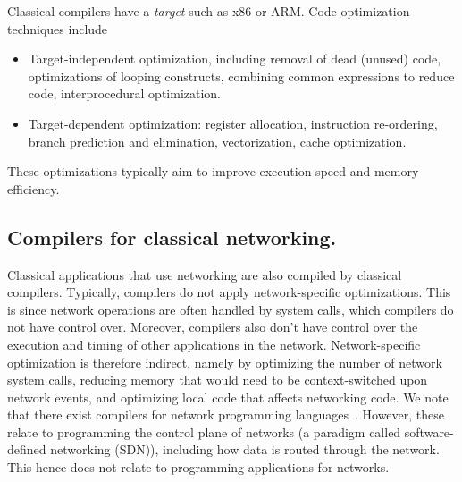 Classical compilers have a \textit{target} such as x86 or ARM.
Code optimization techniques include
\begin{itemize}
  \item Target-independent optimization, including removal of dead (unused) code, optimizations of looping constructs, combining common expressions to reduce code, interprocedural optimization.
  \item Target-dependent optimization: register allocation, instruction re-ordering, branch prediction and elimination, vectorization, cache optimization.
\end{itemize}
These optimizations typically aim to improve execution speed and memory efficiency.

\subsection{Compilers for classical networking.}
Classical applications that use networking are also compiled by classical compilers.
Typically, compilers do not apply network-specific optimizations.
This is since network operations are often handled by system calls, which compilers do not have control over.
Moreover, compilers also don't have control over the execution and timing of other applications in the network.
Network-specific optimization is therefore indirect, namely by optimizing the number of network system calls, reducing memory that would need to be context-switched upon network events, and optimizing local code that affects networking code.
We note that there exist compilers for network programming languages~\cite{monsanto_compiler_2012, li_modular_2020}.
However, these relate to programming the control plane of networks (a paradigm called software-defined networking (SDN)), including how data is routed through the network.
This hence does not relate to programming applications for networks.


